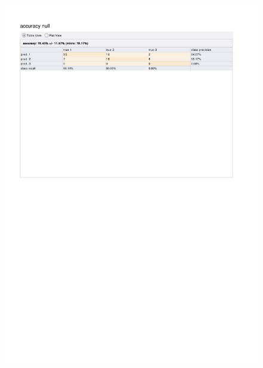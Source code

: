 \begin{figure}[htp]
  \centerline{\includegraphics[trim=0 680 0 80,clip,width=16.09cm]{results/ANN_A_Focus.pdf}} \caption{
} \label{ANN_K_Focus}
\end{figure}

